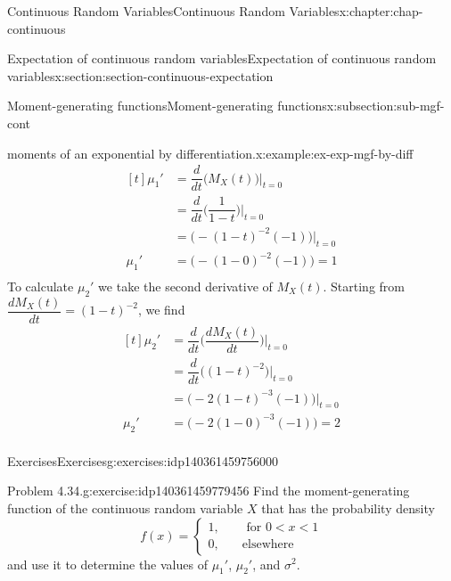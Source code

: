 \documentclass[oneside,10pt,]{book}
\numberwithin{equation}{section}
\newcommand{\lt}{<}
\newcommand{\amp}{&}
\begin{document}
\begin{chapterptx}{Continuous Random Variables}{}{Continuous Random Variables}{}{}{x:chapter:chap-continuous}
\begin{sectionptx}{Expectation of continuous random variables}{}{Expectation of continuous random variables}{}{}{x:section:section-continuous-expectation}
\begin{subsectionptx}{Moment-generating functions}{}{Moment-generating functions}{}{}{x:subsection:sub-mgf-cont}
\begin{example}{moments of an exponential by differentiation.}{x:example:ex-exp-mgf-by-diff}
\begin{equation*}
\begin{aligned}[t]
\mu_1' \amp = \dfrac{d}{dt}\Big(M_X(t)\Big)\Big|_{t=0}\\
\amp = \dfrac{d}{dt}\Big(\dfrac{1}{1-t}\Big)\Big|_{t=0}\\
\amp = \Big(-(1-t)^{-2}(-1)\Big)\Big|_{t=0}\\
\mu_1'  \amp = \Big(-(1-0)^{-2}(-1)\Big) = 1\\
\end{aligned}
\end{equation*}
To calculate \(\mu_2'\) we take the second derivative of \(M_X(t)\).  Starting from \(\dfrac{dM_X(t)}{dt} = (1-t)^{-2}\), we find%
\begin{equation*}
\begin{aligned}[t]
\mu_2' \amp = \dfrac{d}{dt}\Big(\dfrac{dM_X(t)}{dt}\Big)\Big|_{t=0}\\
\amp = \dfrac{d}{dt}\Big((1-t)^{-2}\Big)\Big|_{t=0}\\
\amp = \Big(-2(1-t)^{-3}(-1)\Big)\Big|_{t=0}\\
\mu_2'  \amp = \Big(-2(1-0)^{-3}(-1)\Big) = 2\\
\end{aligned}
\end{equation*}
\end{example}
\end{subsectionptx}
%
%
\typeout{************************************************}
\typeout{************************************************}
%
\begin{exercises-subsection}{Exercises}{}{Exercises}{}{}{g:exercises:idp140361459756000}
\begin{divisionexercise}{1}{Problem 4.34.}{}{g:exercise:idp140361459779456}%
Find the moment-generating function of the continuous random variable \(X\) that has the probability density%
\begin{equation*}
f(x) =
\begin{cases}1, \amp \quad \text{ for }0 \lt x \lt 1\\0, \amp \quad
\text{elsewhere}\end{cases}
\end{equation*}
and use it to determine the values of \(\mu_1'\), \(\mu_2'\), and \(\sigma^2\).%
\end{divisionexercise}%
\end{exercises-subsection}
\end{sectionptx}
%
%
\typeout{************************************************}

\end{chapterptx}
\end{document}
